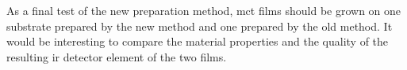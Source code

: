 As a final test of the new preparation method, \ac{mct} films should be grown on one substrate prepared by the new method and one prepared by the old method. It would be interesting to compare the material properties and the quality of the resulting \ac{ir} detector element of the two films.



%





